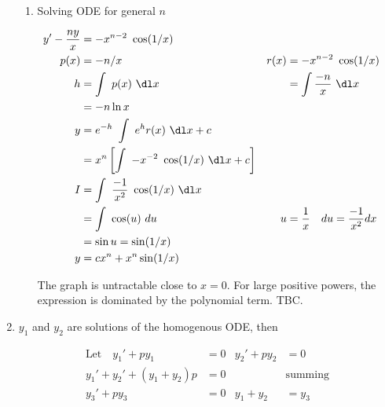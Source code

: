 \begin{enumerate}
\begin{enumerate}
              \item Solving ODE for general $ n $

                    \begin{align}
                        y' - \frac{ny}{x} & = -x^{n-2}\ \cos(1/x)                  \\
                        p(x)              & = -n/x                               &
                        r(x)              & = -x^{n-2}\ \cos(1/x)                  \\
                        h                 & = \int\ p(x)\ \dl x                  &
                                          & = \int \frac{-n}{x}\ \dl x             \\
                                          & = -n\ln x                              \\
                        y                 & = e^{-h}\ \int\ e^{h}r(x)\ \dl x + c   \\
                                          & = x^{n} \left[ \int\ -x^{-2}
                        \ \cos(1/x)\ \dl x + c \right]                             \\
                        I                 & =\int\ \frac{-1}{x^{2}}\ \cos(1/x)
                        \ \dl x                                                    \\
                                          & =\int\ \cos(u)\ du                   &
                        u                 & = \frac{1}{x}\quad du
                        = \frac{-1}{x^{2}}dx                                       \\
                                          & = \sin u = \sin(1/x)                   \\
                        y                 & = cx^{n} + x^{n}\sin(1/x)
                    \end{align}

                    The graph is untractable close to $ x = 0 $. For large positive
                    powers, the expression is dominated by the polynomial term. TBC.
          \end{enumerate}

    \item $ y_{1} $ and $ y_{2} $ are solutions of the homogenous ODE, then

          \begin{align}
              \text{Let} \quad y_{1}' + py_{1}   & = 0            &
              y_{2}' + py_{2}                    & = 0              \\
              y_{1}' + y_{2}' + (y_{1} + y_{2})p & = 0            &
                                                 & \text{summing}   \\
              y_{3}' + py_{3}                    & = 0            &
              y_{1} + y_{2}                      & = y_{3}
          \end{align}


\end{enumerate}
